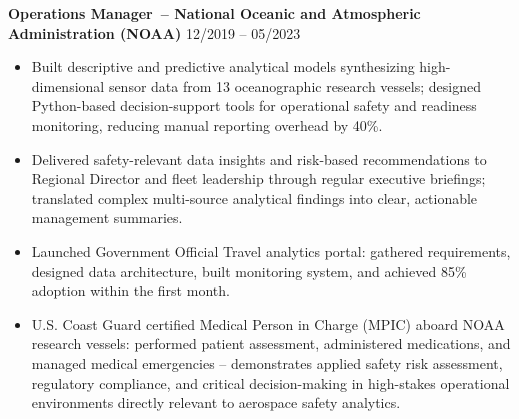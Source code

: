 \documentclass[10pt,letterpaper]{moderncv}
\begin{document}
\textbf{Operations Manager~-- National Oceanic and Atmospheric Administration (NOAA)} \hfill 12/2019 -- 05/2023
\vspace*{-2mm}
\begin{itemize}[label={-}, itemsep=-1.0ex]
  \item Built descriptive and predictive analytical models synthesizing high-dimensional sensor data from 13 oceanographic research vessels; designed Python-based decision-support tools for operational safety and readiness monitoring, reducing manual reporting overhead by 40\%.
  \item Delivered safety-relevant data insights and risk-based recommendations to Regional Director and fleet leadership through regular executive briefings; translated complex multi-source analytical findings into clear, actionable management summaries.
  \item Launched Government Official Travel analytics portal: gathered requirements, designed data architecture, built monitoring system, and achieved 85\% adoption within the first month.
  \item U.S. Coast Guard certified Medical Person in Charge (MPIC) aboard NOAA research vessels: performed patient assessment, administered medications, and managed medical emergencies -- demonstrates applied safety risk assessment, regulatory compliance, and critical decision-making in high-stakes operational environments directly relevant to aerospace safety analytics.
\end{itemize}
\end{document}
